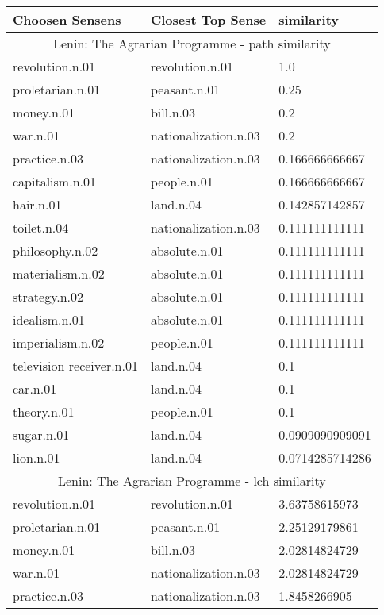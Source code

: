 
    \begin{center}
      \begin{tabular}{ | l | l | l |}
        \hline
        Choosen Sensens & Closest Top Sense & similarity  \\ \hline
\multicolumn{3}{|c|}{Lenin: The Agrarian Programme  - path similarity} \\ \hline
revolution.n.01 & revolution.n.01 & 1.0\\ \hline
proletarian.n.01 & peasant.n.01 & 0.25\\ \hline
money.n.01 & bill.n.03 & 0.2\\ \hline
war.n.01 & nationalization.n.03 & 0.2\\ \hline
practice.n.03 & nationalization.n.03 & 0.166666666667\\ \hline
capitalism.n.01 & people.n.01 & 0.166666666667\\ \hline
hair.n.01 & land.n.04 & 0.142857142857\\ \hline
toilet.n.04 & nationalization.n.03 & 0.111111111111\\ \hline
philosophy.n.02 & absolute.n.01 & 0.111111111111\\ \hline
materialism.n.02 & absolute.n.01 & 0.111111111111\\ \hline
strategy.n.02 & absolute.n.01 & 0.111111111111\\ \hline
idealism.n.01 & absolute.n.01 & 0.111111111111\\ \hline
imperialism.n.02 & people.n.01 & 0.111111111111\\ \hline
television receiver.n.01 & land.n.04 & 0.1\\ \hline
car.n.01 & land.n.04 & 0.1\\ \hline
theory.n.01 & people.n.01 & 0.1\\ \hline
sugar.n.01 & land.n.04 & 0.0909090909091\\ \hline
lion.n.01 & land.n.04 & 0.0714285714286\\ \hline
\multicolumn{3}{|c|}{Lenin: The Agrarian Programme  - lch similarity} \\ \hline
revolution.n.01 & revolution.n.01 & 3.63758615973\\ \hline
proletarian.n.01 & peasant.n.01 & 2.25129179861\\ \hline
money.n.01 & bill.n.03 & 2.02814824729\\ \hline
war.n.01 & nationalization.n.03 & 2.02814824729\\ \hline
practice.n.03 & nationalization.n.03 & 1.8458266905\\ \hline

\end{tabular}
\end{center}
